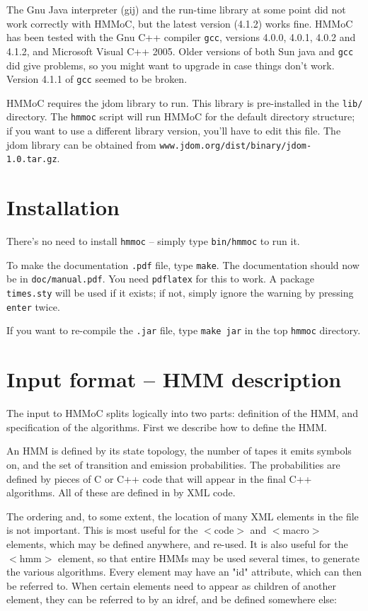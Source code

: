 \documentclass{article}
\begin{document}
The Gnu Java interpreter (gij) and the run-time library at some point did not work correctly
with HMMoC, but the latest version (4.1.2) works fine.  HMMoC has been tested
with the Gnu C++ compiler {\tt gcc}, versions 4.0.0, 4.0.1, 4.0.2 and 4.1.2, and
Microsoft Visual C++ 2005.
Older versions of both Sun java and {\tt gcc} did give problems, so you might want to upgrade
in case things don't work.  Version 4.1.1 of {\tt gcc} seemed to be broken.

HMMoC requires the jdom library to run.  This library is pre-installed in the {\tt lib/} directory.
The {\tt hmmoc} script will run HMMoC for the default directory structure; if you want to
use a different library version, you'll have to edit 
this file.  The jdom library can be obtained from {\tt www.jdom.org/dist/binary/jdom-1.0.tar.gz}.


\section{Installation}

There's no need to install {\tt hmmoc} -- simply type {\tt bin/hmmoc} to run it.

To make the documentation {\tt .pdf} file, type {\tt make}.  The documentation
should now be in {\tt doc/manual.pdf}.  You need {\tt pdflatex} for this to work.
A package {\tt times.sty} will be used if it exists; if not, simply ignore the
warning by pressing {\tt enter} twice.

If you want to re-compile the {\tt .jar} file, type {\tt make jar} in the
top {\tt hmmoc} directory.


\section{Input format -- HMM description}

The input to HMMoC splits logically into two parts: definition of the 
HMM, and specification of the algorithms.  First we describe how to
define the HMM.

An HMM is defined by its state topology, the number of tapes it emits
symbols on, and the set of transition and emission probabilities.  The
probabilities are defined by pieces of C or C++ code that will appear 
in the final C++ algorithms.  All of these are defined in by XML code.

The ordering and, to some extent, the location of many XML elements in 
the file is not important.  This is most useful for the $<$code$>$ and 
$<$macro$>$ elements, which may be defined anywhere, and re-used.  It is 
also useful for the $<$hmm$>$ element, so that entire HMMs may be used
several times, to generate the various algorithms.  Every element may 
have an "id" attribute, which can then be referred to.  When certain 
elements need to appear as children of another element, they can be 
referred to by an idref, and be defined somewhere else:
\end{document}
